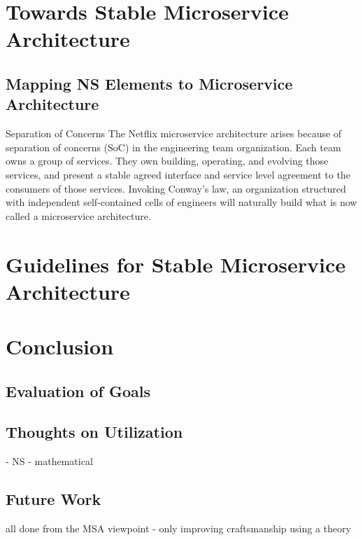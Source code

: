 \documentclass[thesis=M,english,hidelinks]{FITthesis}[2012/10/20]
\begin{document}
\chapter{Towards Stable Microservice Architecture}
\label{sec:msa_compliance}
\section{Mapping NS Elements to Microservice Architecture}


Separation of Concerns
The Netflix microservice architecture arises because of separation of concerns (SoC) in the engineering team organization. Each team owns a group of services. They own building, operating, and evolving those services, and present a stable agreed interface and service level agreement to the consumers of those services. Invoking Conway’s law, an organization structured with independent self-contained cells of engineers will naturally build what is now called a microservice architecture.


\chapter{Guidelines for Stable Microservice Architecture}
\label{sec:guidelines}

% 
% 
\chapter{Conclusion}
\label{sec:conclusion}
\section{Evaluation of Goals}





\section{Thoughts on Utilization}
- NS - mathematical 





\section{Future Work}
all done from the MSA viewpoint - only improving craftsmanship using a theory
\end{document}
